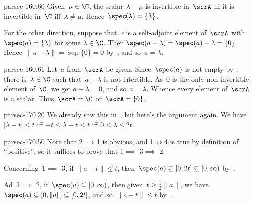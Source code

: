 \documentclass[b5page]{book}
\begin{document}
\begin{solution}{parsec-160.60}%
Given~$\mu\in \C$,
the scalar~$\lambda - \mu$ 
is invertible in~$\scrA$
iff it is invertible in~$\C$
iff~$\lambda\neq \mu$.
Hence~$\spec(\lambda)=\{\lambda\}$.

For the other direction,
suppose that~$a$ is a self-adjoint element of~$\scrA$
    with $\spec(a)=\{\lambda\}$ for some $\lambda\in\C$.
Then $\spec(a-\lambda)=\spec(a)-\lambda = \{0\}$.
    Hence~$\|a-\lambda\|=\sup\{0\}=0$
    by~,
    and so~$a=\lambda$.
\end{solution}
\begin{solution}{parsec-160.61}
    Let~$a$ from~$\scrA$ be given.
    Since~$\spec(a)$ is not empty by~,
    there is~$\lambda\in\C$ such that~$a-\lambda$ is not intertible.
    As~$0$ is the only non-invertible element of~$\C$,
    we get $a-\lambda = 0$, and so~$a=\lambda$.
    Whence every element of~$\scrA$ is a scalar.
    Thus~$\scrA=\C$ or~$\scrA=\{0\}$.
\end{solution}
\begin{solution}{parsec-170.20}
    We already saw this in~,
    but here's the argument again.
We have $\left|\lambda - t\right| \leq t$
iff $-t\leq \lambda - t\leq t$
iff $0\leq \lambda \leq 2t$.
\end{solution}
\begin{solution}{parsec-170.50}
    Note that
2$\implies$1 is obvious, and
1$\iff$4 is true by definition of ``positive'',
so it suffices to prove 
that 1$\implies$ 3$\implies$ 2.

Concerning~1$\implies$ 3, if
$\|a-t\|\leq t$,
    then~$\spec(a)\subseteq [0,2t]\subseteq [0,\infty)$
    by~.

Ad~3$\implies$ 2,
    if~$\spec(a)\subseteq [0,\infty)$,
    then given~$t\geq \frac{1}{2}\|a\|$,
    we have $\spec(a)\subseteq [0,\|a\|]\subseteq [0,2t]$,
    and so~$\|a-t\|\leq t$ by~.
\end{solution}
\end{document}
